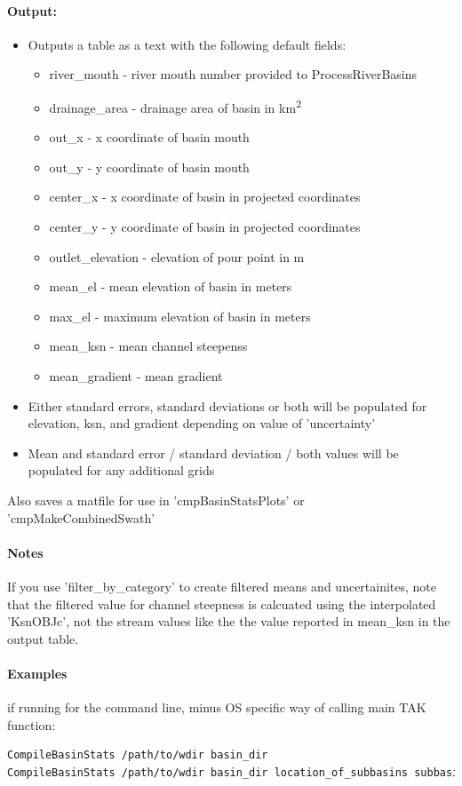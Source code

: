 \paragraph{Output:}
\begin{itemize}
\item Outputs a table as a text with the following default fields:
\begin{itemize}
\item river\_mouth - river mouth number provided to ProcessRiverBasins
\item drainage\_area - drainage area of basin in km\textsuperscript{2}
\item out\_x - x coordinate of basin mouth
\item out\_y - y coordinate of basin mouth
\item center\_x - x coordinate of basin in projected coordinates
\item center\_y - y coordinate of basin in projected coordinates
\item outlet\_elevation - elevation of pour point in m
\item mean\_el - mean elevation of basin in meters
\item max\_el - maximum elevation of basin in meters
\item mean\_ksn - mean channel steepenss
\item mean\_gradient - mean gradient
\end{itemize}
\item Either standard errors, standard deviations or both will be populated for elevation, ksn, and gradient depending on value of 'uncertainty'
\item Mean and standard error / standard deviation / both values will be populated for any additional grids
\end{itemize}

Also saves a matfile for use in 'cmpBasinStatsPlots' or 'cmpMakeCombinedSwath'

\paragraph{Notes}
If you use 'filter\_by\_category' to create filtered means and uncertainites, note that the filtered value for channel steepness is calcuated using the 
interpolated 'KsnOBJc', not the stream values like the the value reported in mean\_ksn in the output table.

\paragraph{Examples} if running for the command line, minus OS specific way of calling main TAK function:
\begin{lstlisting}[language=bash]
CompileBasinStats /path/to/wdir basin_dir
CompileBasinStats /path/to/wdir basin_dir location_of_subbasins subbasinsv1 include subdivided
\end{lstlisting}

